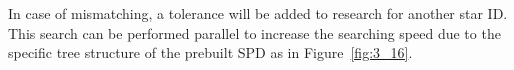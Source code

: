 
\noindent In case of mismatching, a tolerance will be added to research for another star ID. This search can be performed parallel to increase the searching speed due to the specific tree structure of the prebuilt SPD as in Figure~\ref{fig:3_16}.

